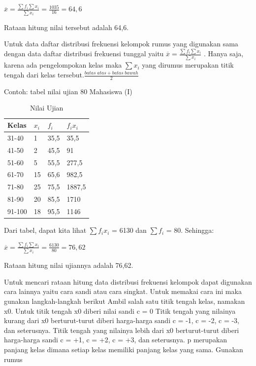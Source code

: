 \documentclass[11pt,fleqn]{book} %
\begin{document}
{$ \overline{x} = \frac{\sum f_{i}\sum x_{i}}{\sum x_{i}} = \frac{1035}{16} = 64,6 $

Rataan hitung nilai tersebut adalah 64,6.


Untuk data daftar distribusi frekuensi kelompok rumus yang digunakan sama dengan data daftar distribusi frekuensi tunggal yaitu $\overline{x} = \frac{\sum f_{i}\sum x_{i}}{\sum x_{i}}$ . Hanya saja, karena ada pengelompokan kelas maka $\sum x_{i}$ yang dirumus merupakan titik tengah dari kelas tersebut.$\frac{batas\;atas + batas\;bawah}{2}$

Contoh: tabel nilai ujian 80 Mahasiswa (I)

\begin{table}[h]
\centering
\begin{tabular}{l l l l}
\toprule
\textbf{Kelas} & \textbf{$x_{i}$} & \textbf{$f_{i}$} & \textbf{$f_{i}x_{i}$}\\
\midrule
31-40 & 1 & 35,5 & 35,5 \\
41-50 & 2 & 45,5 & 91 \\
51-60 & 5 & 55,5 & 277,5\\
61-70 & 15 & 65,6 & 982,5\\
71-80 & 25 & 75,5 & 1887,5\\
81-90 & 20 & 85,5 & 1710\\
91-100 & 18 & 95,5 & 1146\\
\bottomrule
\end{tabular}
\caption{Nilai Ujian}
\end{table}

Dari tabel, dapat kita lihat $\sum f_{i}x_{i}$  = 6130 dan $\sum f_{i}$  = 80. Sehingga:


$ \overline{x} = \frac{\sum f_{i}\sum x_{i}}{\sum x_{i}} = \frac{6130}{80} = 76,62 $

Rataan hitung nilai ujiannya adalah 76,62.

Untuk mencari rataan hitung data distribusi frekuensi kelompok dapat digunakan cara lainnya yaitu cara sandi atau cara singkat. Untuk memakai cara ini maka gunakan langkah-langkah berikut
	Ambil salah satu titik tengah kelas, namakan x0.
	Untuk titik tengah x0 diberi nilai sandi c = 0
	Titik tengah yang nilainya kurang dari x0 berturut-turut diberi harga-harga sandi c = -1, c = -2, c = -3, dan seterusnya.
	Titik tengah yang nilainya lebih dari x0 berturut-turut diberi harga-harga sandi c = +1, c = +2, c = +3, dan seterusnya.
	p merupakan panjang kelas dimana setiap kelas memiliki panjang kelas yang sama.
Gunakan rumus

}
\end{document}
